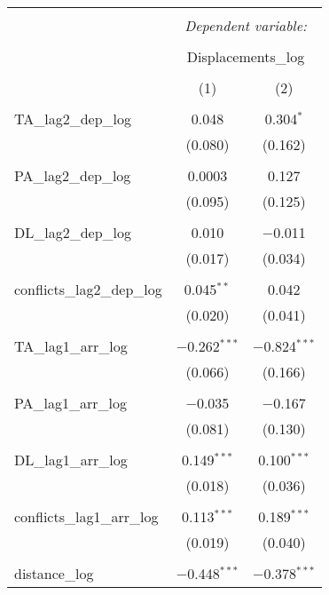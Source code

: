 
\begin{table}[!htbp] \centering 
  \caption{} 
  \label{} 
\begin{tabular}{@{\extracolsep{5pt}}lcc} 
\\[-1.8ex]\hline 
\hline \\[-1.8ex] 
 & \multicolumn{2}{c}{\textit{Dependent variable:}} \\ 
\cline{2-3} 
\\[-1.8ex] & \multicolumn{2}{c}{Displacements\_log} \\ 
\\[-1.8ex] & (1) & (2)\\ 
\hline \\[-1.8ex] 
 TA\_lag2\_dep\_log & 0.048 & 0.304$^{*}$ \\ 
  & (0.080) & (0.162) \\ 
  & & \\ 
 PA\_lag2\_dep\_log & 0.0003 & 0.127 \\ 
  & (0.095) & (0.125) \\ 
  & & \\ 
 DL\_lag2\_dep\_log & 0.010 & $-$0.011 \\ 
  & (0.017) & (0.034) \\ 
  & & \\ 
 conflicts\_lag2\_dep\_log & 0.045$^{**}$ & 0.042 \\ 
  & (0.020) & (0.041) \\ 
  & & \\ 
 TA\_lag1\_arr\_log & $-$0.262$^{***}$ & $-$0.824$^{***}$ \\ 
  & (0.066) & (0.166) \\ 
  & & \\ 
 PA\_lag1\_arr\_log & $-$0.035 & $-$0.167 \\ 
  & (0.081) & (0.130) \\ 
  & & \\ 
 DL\_lag1\_arr\_log & 0.149$^{***}$ & 0.100$^{***}$ \\ 
  & (0.018) & (0.036) \\ 
  & & \\ 
 conflicts\_lag1\_arr\_log & 0.113$^{***}$ & 0.189$^{***}$ \\ 
  & (0.019) & (0.040) \\ 
  & & \\ 
 distance\_log & $-$0.448$^{***}$ & $-$0.378$^{***}$ \\ 

\end{tabular}
\end{table}
